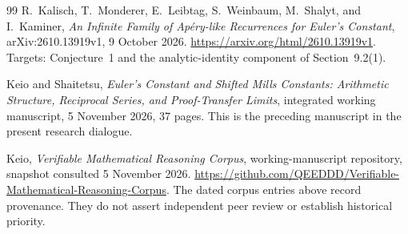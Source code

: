 \documentclass[11pt,a4paper]{article}
\numberwithin{equation}{section}
\theoremstyle{definition}
\theoremstyle{remark}
\begin{document}
\begin{thebibliography}{99}
R.~Kalisch, T.~Monderer, E.~Leibtag, S.~Weinbaum, M.~Shalyt, and
I.~Kaminer, \emph{An Infinite Family of Ap\'ery-like Recurrences for
Euler's Constant}, arXiv:2610.13919v1, 9 October 2026.
\url{https://arxiv.org/html/2610.13919v1}.
Targets: Conjecture~1 and the analytic-identity component of Section~9.2(1).

Keio and Shaitetsu, \emph{Euler's Constant and Shifted Mills Constants:
Arithmetic Structure, Reciprocal Series, and Proof-Transfer Limits},
integrated working manuscript, 5 November 2026, 37 pages.
This is the preceding manuscript in the present research dialogue.

Keio, \emph{Verifiable Mathematical Reasoning Corpus},
working-manuscript repository, snapshot consulted 5 November 2026.
\url{https://github.com/QEEDDD/Verifiable-Mathematical-Reasoning-Corpus}.
The dated corpus entries above record provenance. They do not assert
independent peer review or establish historical priority.
\end{thebibliography}
\end{document}
